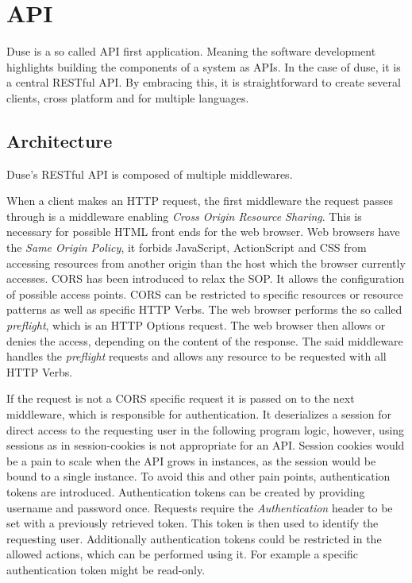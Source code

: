 \section{API}

Duse is a so called API first application. Meaning the software development
highlights building the components of a system as APIs. In the case of duse, it
is a central RESTful API. By embracing this, it is straightforward to create
several clients, cross platform and for multiple languages.

\subsection{Architecture}

Duse's RESTful API is composed of multiple middlewares.

When a client makes an HTTP request, the first middleware the request passes
through is a middleware enabling \textit{Cross Origin Resource Sharing}. This
is necessary for possible HTML front ends for the web browser. Web browsers have
the \textit{Same Origin Policy}, it forbids JavaScript, ActionScript and CSS
from accessing resources from another origin than the host which the browser
currently accesses. CORS has been introduced to relax the SOP. It allows the
configuration of possible access points. CORS can be restricted to specific
resources or resource patterns as well as specific HTTP Verbs. The web browser
performs the so called \textit{preflight}, which is an HTTP Options request. The
web browser then allows or denies the access, depending on the content of the
response. The said middleware handles the \textit{preflight} requests and
allows any resource to be requested with all HTTP Verbs.

If the request is not a CORS specific request it is passed on to the next
middleware, which is responsible for authentication. It deserializes a session
for direct access to the requesting user in the following program logic,
however, using sessions as in session-cookies is not appropriate for an API.
Session cookies would be a pain to scale when the API grows in instances, as
the session would be bound to a single instance. To avoid this and other pain
points, authentication tokens are introduced. Authentication tokens can be
created by providing username and password once. Requests require the
\textit{Authentication} header to be set with a previously retrieved token.
This token is then used to identify the requesting user. Additionally
authentication tokens could be restricted in the allowed actions, which can be
performed using it. For example a specific authentication token might be
read-only.

